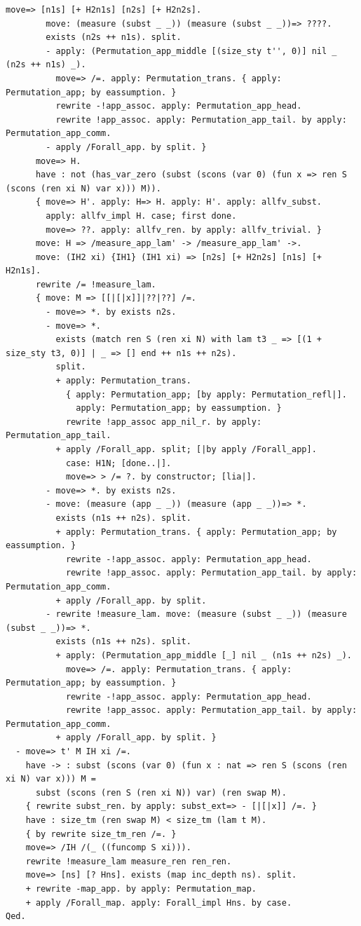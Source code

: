 \documentclass[10pt,a4paper]{article}
\begin{document}
\begin{lstlisting}[style=authorcoq]
        move=> [n1s] [+ H2n1s] [n2s] [+ H2n2s].
        move: (measure (subst _ _)) (measure (subst _ _))=> ????.
        exists (n2s ++ n1s). split.
        - apply: (Permutation_app_middle [(size_sty t'', 0)] nil _ (n2s ++ n1s) _).
          move=> /=. apply: Permutation_trans. { apply: Permutation_app; by eassumption. }
          rewrite -!app_assoc. apply: Permutation_app_head.
          rewrite !app_assoc. apply: Permutation_app_tail. by apply: Permutation_app_comm.
        - apply /Forall_app. by split. }
      move=> H. 
      have : not (has_var_zero (subst (scons (var 0) (fun x => ren S (scons (ren xi N) var x))) M)).
      { move=> H'. apply: H=> H. apply: H'. apply: allfv_subst.
        apply: allfv_impl H. case; first done.
        move=> ??. apply: allfv_ren. by apply: allfv_trivial. }
      move: H => /measure_app_lam' -> /measure_app_lam' ->.
      move: (IH2 xi) {IH1} (IH1 xi) => [n2s] [+ H2n2s] [n1s] [+ H2n1s].
      rewrite /= !measure_lam.
      { move: M => [[|[|x]]|??|??] /=.
        - move=> *. by exists n2s.
        - move=> *.
          exists (match ren S (ren xi N) with lam t3 _ => [(1 + size_sty t3, 0)] | _ => [] end ++ n1s ++ n2s).
          split.
          + apply: Permutation_trans.
            { apply: Permutation_app; [by apply: Permutation_refl|].
              apply: Permutation_app; by eassumption. }
            rewrite !app_assoc app_nil_r. by apply: Permutation_app_tail.
          + apply /Forall_app. split; [|by apply /Forall_app].
            case: H1N; [done..|].
            move=> > /= ?. by constructor; [lia|].
        - move=> *. by exists n2s.
        - move: (measure (app _ _)) (measure (app _ _))=> *.
          exists (n1s ++ n2s). split.
          + apply: Permutation_trans. { apply: Permutation_app; by eassumption. }
            rewrite -!app_assoc. apply: Permutation_app_head.
            rewrite !app_assoc. apply: Permutation_app_tail. by apply: Permutation_app_comm.
          + apply /Forall_app. by split.
        - rewrite !measure_lam. move: (measure (subst _ _)) (measure (subst _ _))=> *.
          exists (n1s ++ n2s). split.
          + apply: (Permutation_app_middle [_] nil _ (n1s ++ n2s) _).
            move=> /=. apply: Permutation_trans. { apply: Permutation_app; by eassumption. }
            rewrite -!app_assoc. apply: Permutation_app_head.
            rewrite !app_assoc. apply: Permutation_app_tail. by apply: Permutation_app_comm.
          + apply /Forall_app. by split. }
  - move=> t' M IH xi /=.
    have -> : subst (scons (var 0) (fun x : nat => ren S (scons (ren xi N) var x))) M = 
      subst (scons (ren S (ren xi N)) var) (ren swap M).
    { rewrite subst_ren. by apply: subst_ext=> - [|[|x]] /=. }
    have : size_tm (ren swap M) < size_tm (lam t M).
    { by rewrite size_tm_ren /=. }
    move=> /IH /(_ ((funcomp S xi))).
    rewrite !measure_lam measure_ren ren_ren.
    move=> [ns] [? Hns]. exists (map inc_depth ns). split.
    + rewrite -map_app. by apply: Permutation_map.
    + apply /Forall_map. apply: Forall_impl Hns. by case.
Qed.


\end{lstlisting}
\end{document}
